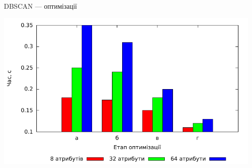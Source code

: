\documentclass{beamer}
\begin{document}
    \begin{frame}{DBSCAN --- оптимізації}
        \begin{center}
            \includegraphics[scale=0.8]{dbscan_compare.pdf}
        \end{center}
    \end{frame}
    
\end{document}
